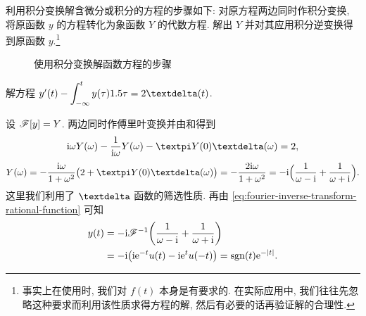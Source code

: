 利用积分变换解含微分或积分的方程的步骤如下: 对原方程两边同时作积分变换, 将原函数 $y$ 的方程转化为象函数 $Y$ 的代数方程.
解出 $Y$ 并对其应用积分逆变换得到原函数 $y$.\footnote{
  事实上在使用\thmFDif 时, 我们对 $f(t)$ 本身是有要求的.
  在实际应用中, 我们往往先忽略这种要求而利用该性质求得方程的解, 然后有必要的话再验证解的合理性.
}

\begin{figure}[H]
  \centering
  \caption{使用积分变换解函数方程的步骤}
\end{figure}

\begin{example}
  解方程 $y'(t)-\dint_{-\infty}^t y(\tau)\d \tau=2\dirac(t)$.
\end{example}

\begin{solution}
  设 $\mathscr{F}[y]=Y$.
  两边同时作傅里叶变换并由\thmFDif 和\thmFInt 得到
  \[
    \ii \omega Y(\omega)-\frac1{\ii \omega}Y(\omega)
    -\cpi Y(0)\dirac(\omega)=2,
  \]
  \begin{align*}
     Y(\omega)
    =-\frac{\ii \omega}{1+\omega^2}\bigl(2+\cpi Y(0)\dirac(\omega)\bigr)
    =-\frac{2\ii \omega}{1+\omega^2}
    =-\ii\Bigl(\frac1{\omega-\ii}+\frac1{\omega+\ii}\Bigr).
  \end{align*}
  这里我们利用了 $\dirac$ 函数的筛选性质.
  再由 \ref{eq:fourier-inverse-transform-rational-function} 可知
  \begin{align*}
    y(t)&
    =-\mathrm{i}\mathscr{F}^{-1}\biggl(\frac1{\omega-\mathrm{i}}+\frac1{\omega+\mathrm{i}}\biggr)\\&
    =-\mathrm{i}\bigl(\mathrm{i} \mathrm{e}^{-t}u(t)-\mathrm{i} \mathrm{e}^tu(-t)\bigr)
    =\operatorname{sgn}(t)\mathrm{e}^{-\lvert t\rvert}.
  \end{align*}
\end{solution}

